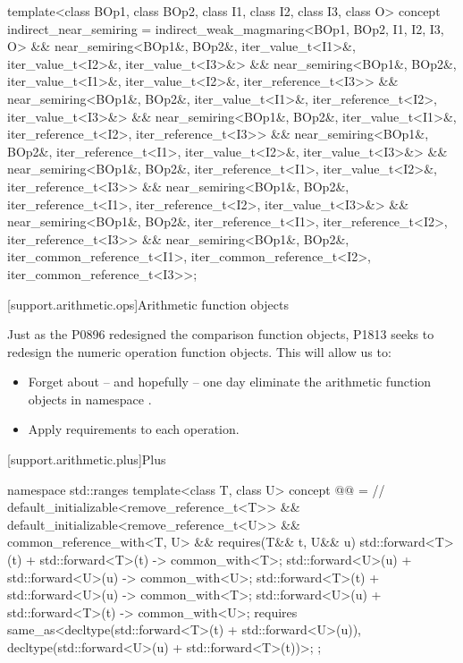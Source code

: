 \begin{itemdecl}
template<class BOp1, class BOp2, class I1, class I2, class I3, class O>
concept indirect_near_semiring =
  indirect_weak_magmaring<BOp1, BOp2, I1, I2, I3, O> &&
  near_semiring<BOp1&, BOp2&, iter_value_t<I1>&, iter_value_t<I2>&, iter_value_t<I3>&> &&
  near_semiring<BOp1&, BOp2&, iter_value_t<I1>&, iter_value_t<I2>&, iter_reference_t<I3>> &&
  near_semiring<BOp1&, BOp2&, iter_value_t<I1>&, iter_reference_t<I2>, iter_value_t<I3>&> &&
  near_semiring<BOp1&, BOp2&, iter_value_t<I1>&, iter_reference_t<I2>, iter_reference_t<I3>> &&
  near_semiring<BOp1&, BOp2&, iter_reference_t<I1>, iter_value_t<I2>&, iter_value_t<I3>&> &&
  near_semiring<BOp1&, BOp2&, iter_reference_t<I1>, iter_value_t<I2>&, iter_reference_t<I3>> &&
  near_semiring<BOp1&, BOp2&, iter_reference_t<I1>, iter_reference_t<I2>, iter_value_t<I3>&> &&
  near_semiring<BOp1&, BOp2&, iter_reference_t<I1>, iter_reference_t<I2>, iter_reference_t<I3>> &&
  near_semiring<BOp1&, BOp2&, iter_common_reference_t<I1>, iter_common_reference_t<I2>,
    iter_common_reference_t<I3>>;
\end{itemdecl}

[support.arithmetic.ops]{Arithmetic function objects}

Just as the P0896 redesigned the comparison function objects, P1813 seeks to redesign the numeric
operation function objects. This will allow us to:

\begin{itemize}
   \item Forget about -- and hopefully -- one day eliminate the arithmetic function objects in
         namespace .
   \item Apply requirements to each operation.
\end{itemize}

[support.arithmetic.plus]{Plus}

\begin{itemdecl}
namespace std::ranges {
  template<class T, class U>
  concept @@ = // \expos
    default_initializable<remove_reference_t<T>> &&
    default_initializable<remove_reference_t<U>> &&
    common_reference_with<T, U> &&
    requires(T&& t, U&& u) {
      { std::forward<T>(t) + std::forward<T>(t) } -> common_with<T>;
      { std::forward<U>(u) + std::forward<U>(u) } -> common_with<U>;
      { std::forward<T>(t) + std::forward<U>(u) } -> common_with<T>;
      { std::forward<U>(u) + std::forward<T>(t) } -> common_with<U>;
      requires same_as<decltype(std::forward<T>(t) + std::forward<U>(u)),
                       decltype(std::forward<U>(u) + std::forward<T>(t))>;
    };
}
\end{itemdecl}


